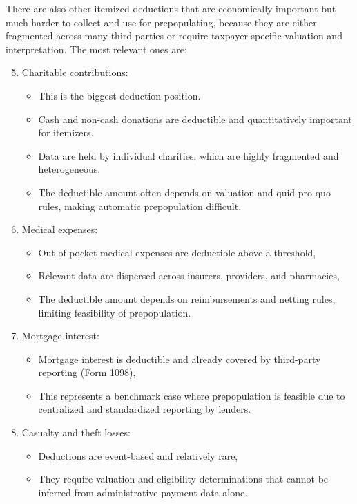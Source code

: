 \documentclass[12pt]{article}
\begin{document}
There are also other itemized deductions that are economically important but much harder to collect and use for prepopulating, because they are either fragmented across many third parties or require taxpayer-specific valuation and interpretation. The most relevant ones are:

\begin{enumerate}
    \setcounter{enumi}{4}
    \item Charitable contributions:
    \begin{itemize}
        \item This is the biggest deduction position.
        \item Cash and non-cash donations are deductible and quantitatively important for itemizers.
        \item Data are held by individual charities, which are highly fragmented and heterogeneous.
        \item The deductible amount often depends on valuation and quid-pro-quo rules, making automatic prepopulation difficult.
    \end{itemize}
    \item Medical expenses:
    \begin{itemize}
        \item Out-of-pocket medical expenses are deductible above a threshold,
        \item Relevant data are dispersed across insurers, providers, and pharmacies,
        \item The deductible amount depends on reimbursements and netting rules, limiting feasibility of prepopulation.
    \end{itemize}
    \item Mortgage interest:
    \begin{itemize}
        \item Mortgage interest is deductible and already covered by third-party reporting (Form 1098),
        \item This represents a benchmark case where prepopulation is feasible due to centralized and standardized reporting by lenders.
    \end{itemize}
    \item Casualty and theft losses:
    \begin{itemize}
        \item Deductions are event-based and relatively rare,
        \item They require valuation and eligibility determinations that cannot be inferred from administrative payment data alone.

\end{itemize}
\end{enumerate}
\end{document}
